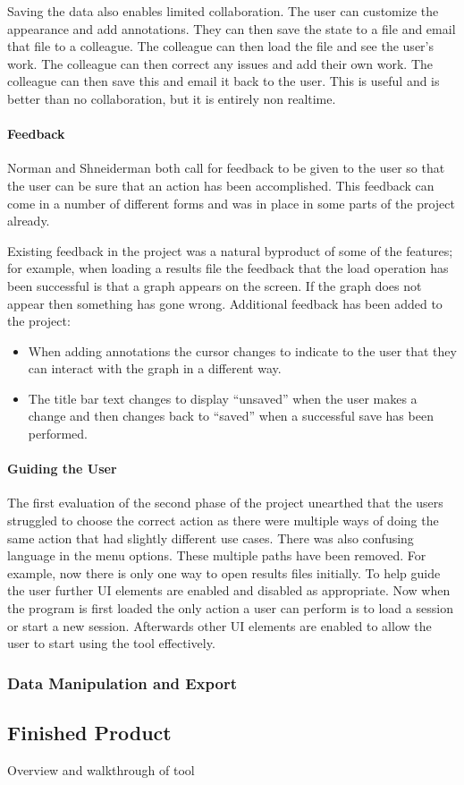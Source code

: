 Saving the data also enables limited collaboration.  The user can customize the appearance and add annotations.  They can then save the state to a file and email that file to a colleague.  The colleague can then load the file and see the user's work.  The colleague can then correct any issues and add their own work.  The colleague can then save this and email it back to the user.  This is useful and is better than no collaboration, but it is entirely non realtime.

\paragraph{Feedback}
Norman and Shneiderman both call for feedback to be given to the user so that the user can be sure that an action has been accomplished.  This feedback can come in a number of different forms and was in place in some parts of the project already.

Existing feedback in the project was a natural byproduct of some of the features; for example, when loading a results file the feedback that the load operation has been successful is that a graph appears on the screen. If the graph does not appear then something has gone wrong.  Additional feedback has been added to the project:
\begin{itemize}
\item When adding annotations the cursor changes to indicate to the user that they can interact with the graph in a different way.
\item The title bar text changes to display ``unsaved'' when the user makes a change and then changes back to ``saved'' when a successful save has been performed.
\end{itemize}

\paragraph{Guiding the User}

The first evaluation of the second phase of the project unearthed that the users struggled to choose the correct action as there were multiple ways of doing the same action that had slightly different use cases.  There was also confusing language in the menu options.  These multiple paths have been removed. For example, now there is only one way to open results files initially.  To help guide the user further \ac{UI} elements are enabled and disabled as appropriate.  Now when the program is first loaded the only action a user can perform is to load a session or start a new session.  Afterwards other \ac{UI} elements are enabled to allow the user to start using the tool effectively.

\subsubsection{Data Manipulation and Export}

\subsection{Finished Product}
Overview and walkthrough of tool
